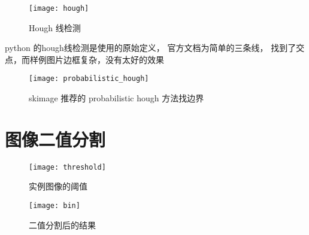 \documentclass{myreport}
\begin{document}
  \begin{figure}[H]
    \centering
    \texttt{[image: hough]}
    \caption{Hough 线检测}
    \label{fig:hough}
  \end{figure}
  python 的hough线检测是使用的原始定义，
  官方文档为简单的三条线，
  找到了交点，而样例图片边框复杂，没有太好的效果
  


  \begin{figure}[H]
    \centering
    \texttt{[image: probabilistic\_hough]}
    \caption{skimage 推荐的 probabilistic hough 方法找边界}
    \label{fig:probabilistic_hough}
  \end{figure}
\section{图像二值分割}

  \begin{figure}[H]
    \centering
    \texttt{[image: threshold]}
    \caption{实例图像的阈值}
    \label{fig:threshold}
  \end{figure}

  \begin{figure}[H]
    \centering
    \texttt{[image: bin]}
    \caption{二值分割后的结果}
    \label{fig:bin}
  \end{figure}

\begin{appendices} %
  
  

\end{appendices}
\end{document}
